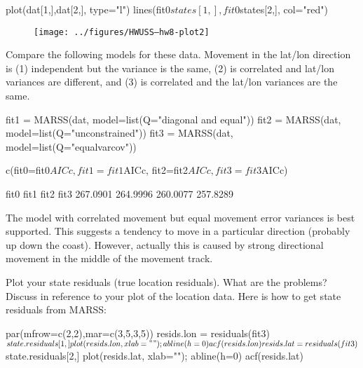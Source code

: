 \begin{wideenumerate}
\begin{Schunk}
\begin{Sinput}
 plot(dat[1,],dat[2,], type="l")
 lines(fit0$states[1,], fit0$states[2,], col="red")
\end{Sinput}
\end{Schunk}

\begin{figure}[htp]
\begin{center}
\texttt{[image: ../figures/HWUSS--hw8-plot2]}
\end{center}
\end{figure}

\item Compare the following models for these data.  Movement in the lat/lon direction is  (1) independent but the variance is the same, (2) is correlated and lat/lon variances are different, and (3) is correlated and the lat/lon variances are the same.  

\begin{Schunk}
\begin{Sinput}
 fit1 = MARSS(dat, model=list(Q="diagonal and equal"))
 fit2 = MARSS(dat, model=list(Q="unconstrained"))
 fit3 = MARSS(dat, model=list(Q="equalvarcov"))
\end{Sinput}
\end{Schunk}

\begin{Schunk}
\begin{Sinput}
 c(fit0=fit0$AICc, fit1=fit1$AICc, 
   fit2=fit2$AICc, fit3=fit3$AICc)
\end{Sinput}
\begin{Soutput}
    fit0     fit1     fit2     fit3 
267.0901 264.9996 260.0077 257.8289 
\end{Soutput}
\end{Schunk}

The model with correlated movement but equal movement error variances is best supported.  This suggests a tendency to move in a particular direction (probably up down the coast).  However, actually this is caused by strong directional movement in the middle of the movement track.

\item Plot your state residuals (true location residuals).  What are the problems? Discuss in reference to your plot of the location data.  Here is how to get state residuals from MARSS:

\begin{Schunk}
\begin{Sinput}
 par(mfrow=c(2,2),mar=c(3,5,3,5))
 resids.lon = residuals(fit3)$state.residuals[1,]
 plot(resids.lon, xlab=""); abline(h=0)
 acf(resids.lon)
 resids.lat = residuals(fit3)$state.residuals[2,]
 plot(resids.lat, xlab=""); abline(h=0)
 acf(resids.lat)
\end{Sinput}
\end{Schunk}


\end{wideenumerate}
